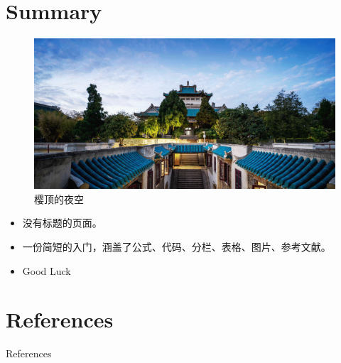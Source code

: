 \documentclass[10pt,aspectratio=169]{beamer}
\begin{document}
\section{Summary}
\begingroup
    \begin{frame}[c]{}
	\begin{figure}
            \centering
            \includegraphics[width=0.6\paperwidth]{source/back1.png}
            \caption{樱顶的夜空}
        \end{figure}
        \begin{itemize}
            \item 没有标题的页面。
            \item 一份简短的入门，涵盖了公式、代码、分栏、表格、图片、参考文献\cite{key}。
            \item \textcolor{whugreen}{\large Good Luck}
        \end{itemize}
    \end{frame}
\endgroup
\section{References}
\begin{frame}{References}
\nocite{*}%
\printbibliography
\end{frame}
\end{document}
